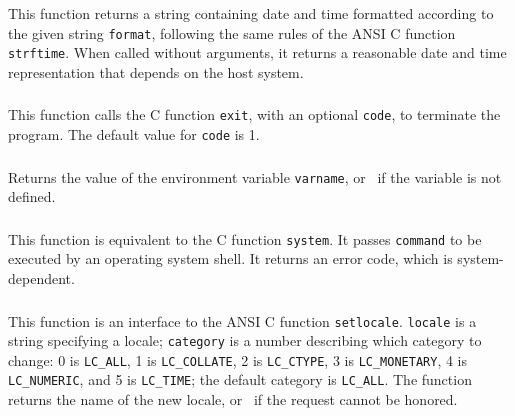 \subsubsection*{\ff {}}

This function returns a string containing date and time
formatted according to the given string \verb|format|,
following the same rules of the ANSI C function \verb|strftime|.
When called without arguments,
it returns a reasonable date and time representation that depends on
the host system.

\subsubsection*{\ff {}}

This function calls the C function \verb|exit|,
with an optional \verb|code|,
to terminate the program.
The default value for \verb|code| is 1.

\subsubsection*{\ff {}}

Returns the value of the environment variable \verb|varname|,
or \nil\ if the variable is not defined.

\subsubsection*{\ff {}}

This function is equivalent to the C function \verb|system|.
It passes \verb|command| to be executed by an operating system shell.
It returns an error code, which is system-dependent.

\subsubsection*{\ff {}}

This function is an interface to the ANSI C function \verb|setlocale|.
\verb|locale| is a string specifying a locale;
\verb|category| is a number describing which category to change:
0 is \verb|LC_ALL|, 1 is \verb|LC_COLLATE|, 2 is \verb|LC_CTYPE|,
3 is \verb|LC_MONETARY|, 4 is \verb|LC_NUMERIC|, and 5 is \verb|LC_TIME|;
the default category is \verb|LC_ALL|.
The function returns the name of the new locale,
or \nil\ if the request cannot be honored.


